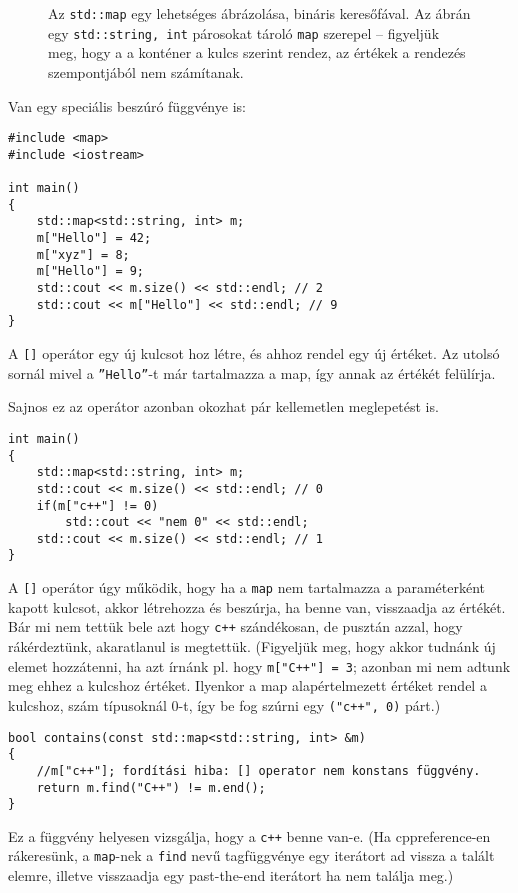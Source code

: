\documentclass[a4paper,11.5pt,table]{article}
\begin{document}
	\begin{figure}[t]
		\centering
		\smallskip
		
		Az \texttt{std::map} egy lehetséges ábrázolása, bináris keresőfával. Az ábrán egy \texttt{std::string, int} párosokat tároló \texttt{map} szerepel -- figyeljük meg, hogy a a konténer a kulcs szerint rendez, az értékek a rendezés szempontjából nem számítanak.
	\end{figure}
	Van egy speciális beszúró függvénye is:
\begin{lstlisting}
#include <map>
#include <iostream>

int main()
{
	std::map<std::string, int> m;
	m["Hello"] = 42;
	m["xyz"] = 8;
	m["Hello"] = 9;
	std::cout << m.size() << std::endl; // 2
	std::cout << m["Hello"] << std::endl; // 9
}
\end{lstlisting}
	A \texttt{[]} operátor egy új kulcsot hoz létre, és ahhoz rendel egy új értéket. Az utolsó sornál mivel a \texttt{''Hello''}-t már tartalmazza a map, így annak az értékét felülírja.
	
	\medskip
	Sajnos ez az operátor azonban okozhat pár kellemetlen meglepetést is.
	\begin{lstlisting}
int main()
{
	std::map<std::string, int> m;
	std::cout << m.size() << std::endl; // 0
	if(m["c++"] != 0)
		std::cout << "nem 0" << std::endl;
	std::cout << m.size() << std::endl; // 1
}
	\end{lstlisting}
	A \texttt{[]} operátor úgy működik, hogy ha a \texttt{map} nem tartalmazza a paraméterként kapott kulcsot, akkor létrehozza és beszúrja, ha benne van, visszaadja az értékét. Bár mi nem tettük bele azt hogy \texttt{c++} szándékosan, de pusztán azzal, hogy rákérdeztünk, akaratlanul is megtettük. (Figyeljük meg, hogy akkor tudnánk új elemet hozzátenni, ha azt írnánk pl. hogy \texttt{m["C++"] = 3}; azonban mi nem adtunk meg ehhez a kulcshoz értéket. Ilyenkor a map alapértelmezett értéket rendel a kulcshoz, szám típusoknál 0-t, így be fog szúrni egy \texttt{("c++", 0)} párt.)
	\begin{lstlisting}
bool contains(const std::map<std::string, int> &m)
{
	//m["c++"]; fordítási hiba: [] operator nem konstans függvény.
	return m.find("C++") != m.end();
}
	\end{lstlisting}
	Ez a függvény helyesen vizsgálja, hogy a \texttt{c++} benne van-e. (Ha cppreference-en rákeresünk, a \texttt{map}-nek a \texttt{find} nevű tagfüggvénye egy iterátort ad vissza a talált elemre, illetve visszaadja egy past-the-end iterátort ha nem találja meg.)
	\medskip
	
\end{document}
